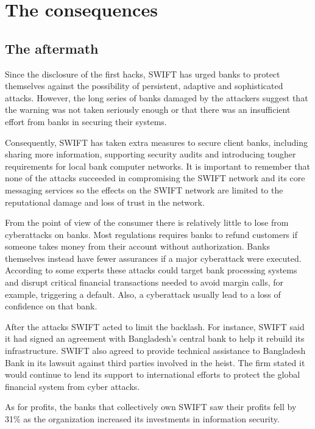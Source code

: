 \documentclass[12pt]{article}
\begin{document}
\section{The consequences}
        
        \subsection{The aftermath}
        Since the disclosure of the first hacks, SWIFT has urged banks to protect themselves against the possibility of persistent, adaptive and sophisticated attacks. However, the long series of banks damaged by the attackers suggest that the warning was not taken seriously enough or that there was an insufficient effort from banks in securing their systems. 
        
        Consequently, SWIFT has taken extra measures to secure client banks, including sharing more information, supporting security audits and introducing tougher requirements for local bank computer networks. It is important to remember that none of the attacks succeeded in compromising the SWIFT network and its core messaging services so the effects on the SWIFT network are limited to the reputational damage and loss of trust in the network.

        From the point of view of the consumer there is relatively little to lose from cyberattacks on banks. Most regulations requires banks to refund customers if someone takes money from their account without authorization. Banks themselves instead have fewer assurances if a major cyberattack were executed. According to some experts these attacks could target bank processing systems and disrupt critical financial transactions needed to avoid margin calls, for example, triggering a default. Also, a cyberattack usually lead to a loss of confidence on that bank. 
        
        After the attacks SWIFT acted to limit the backlash. For instance, SWIFT said it had signed an agreement with Bangladesh’s central bank to help it rebuild its infrastructure. SWIFT also agreed to provide technical assistance to Bangladesh Bank in its lawsuit against third parties involved in the heist. The firm stated it would continue to lend its support to international efforts to protect the global financial system from cyber attacks. 
        
        As for profits, the banks that collectively own SWIFT saw their profits fell by 31\% as the organization increased its investments in information security.\cite{SecurityInvestmentsConsume}
\end{document}
